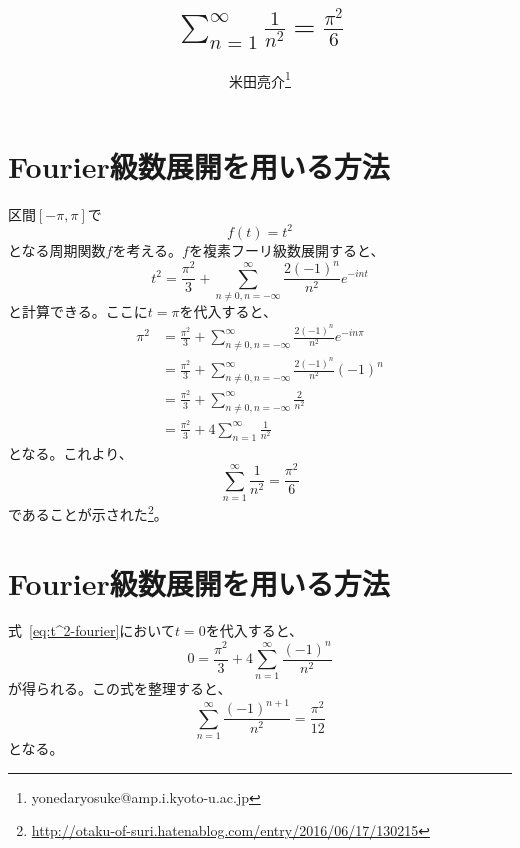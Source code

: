 \documentclass{jsarticle}
\title{$\displaystyle\sum_{n=1}^{\infty}\frac{1}{n^{2}}=\frac{\pi^{2}}{6}$}
\author{米田亮介\footnote{yonedaryosuke@amp.i.kyoto-u.ac.jp}}
\begin{document}
\maketitle


\tableofcontents

\newpage

\section{Fourier級数展開を用いる方法}
区間$[-\pi,\pi]$で
\begin{equation}
	f(t)=t^{2}
\end{equation}
となる周期関数$f$を考える。$f$を複素フーリ級数展開すると、
\begin{equation}
	t^{2}=\frac{\pi^{2}}{3}+\sum_{n\ne 0,n=-\infty}^{\infty}\frac{2(-1)^{n}}{n^{2}}e^{-int}
	\label{eq:t^2-fourier}
\end{equation}
と計算できる。ここに$t=\pi$を代入すると、
\begin{align}
	\pi^{2}&=\frac{\pi^{2}}{3}+\sum_{n\ne 0,n=-\infty}^{\infty}\frac{2(-1)^{n}}{n^{2}}e^{-in\pi}\\
	&=\frac{\pi^{2}}{3}+\sum_{n\ne 0,n=-\infty}^{\infty}\frac{2(-1)^{n}}{n^{2}}(-1)^{n}\\
	&=\frac{\pi^{2}}{3}+\sum_{n\ne 0,n=-\infty}^{\infty}\frac{2}{n^{2}}\\
	&=\frac{\pi^{2}}{3}+4\sum_{n=1}^{\infty}\frac{1}{n^{2}}
\end{align}
となる。これより、
\begin{equation}
	\sum_{n=1}^{\infty}\frac{1}{n^{2}}=\frac{\pi^{2}}{6}
\end{equation}
であることが示された\footnote{\url{http://otaku-of-suri.hatenablog.com/entry/2016/06/17/130215}}。

\newpage

\section{Fourier級数展開を用いる方法}
式~\eqref{eq:t^2-fourier}において$t=0$を代入すると、
\begin{equation}
	0=\frac{\pi^{2}}{3}+4\sum_{n=1}^{\infty}\frac{(-1)^{n}}{n^{2}}
\end{equation}
が得られる。この式を整理すると、
\begin{equation}
	\sum_{n=1}^{\infty}\frac{(-1)^{n+1}}{n^{2}}=\frac{\pi^{2}}{12}
\end{equation}
となる。
\end{document}
